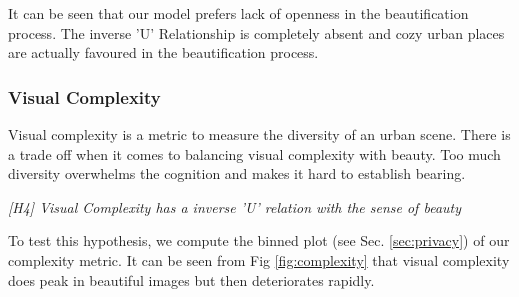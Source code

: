 
It can be seen that our model prefers lack of openness in the beautification process. The inverse 'U' Relationship is completely absent and cozy urban places are actually favoured in the beautification process. 



\subsubsection{Visual Complexity }
Visual complexity is a metric to measure the diversity of an urban scene. There is a trade off  when it comes to balancing visual complexity with beauty. Too much diversity overwhelms the cognition and makes it hard to establish bearing. 
\par
\textit{[H4] Visual Complexity has a inverse 'U' relation with the sense of beauty }
\par

To test  this hypothesis, we compute the binned plot (see Sec. \ref{sec:privacy}) of our complexity metric. It can be seen from Fig \ref{fig:complexity} that visual complexity does peak in beautiful images but then deteriorates rapidly.



